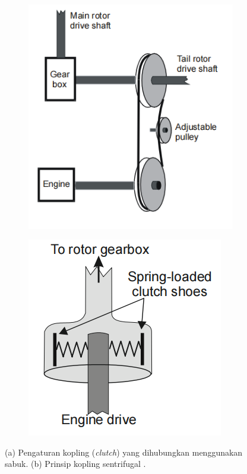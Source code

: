 \begin{figure}[H]
	\begin{subfigure}{0.35\textwidth}
	\centering
	\includegraphics[width=\linewidth]{gambar/belt-driven_clutch.png}
	\caption{}
	\label{fig:belt-driven_clutch}
	\end{subfigure}
\centering
	\begin{subfigure}{0.35\textwidth}
	\centering
	\includegraphics[width=\linewidth]{gambar/centrifugal_clutch.png}
	\caption{}
	\label{fig:centrifugal_clutch}
\end{subfigure}
	\caption{(a) Pengaturan kopling (\textit{clutch}) yang dihubungkan menggunakan sabuk. (b) Prinsip kopling sentrifugal \cite{handbook}.}
	\label{fig:clutch}
\end{figure}

